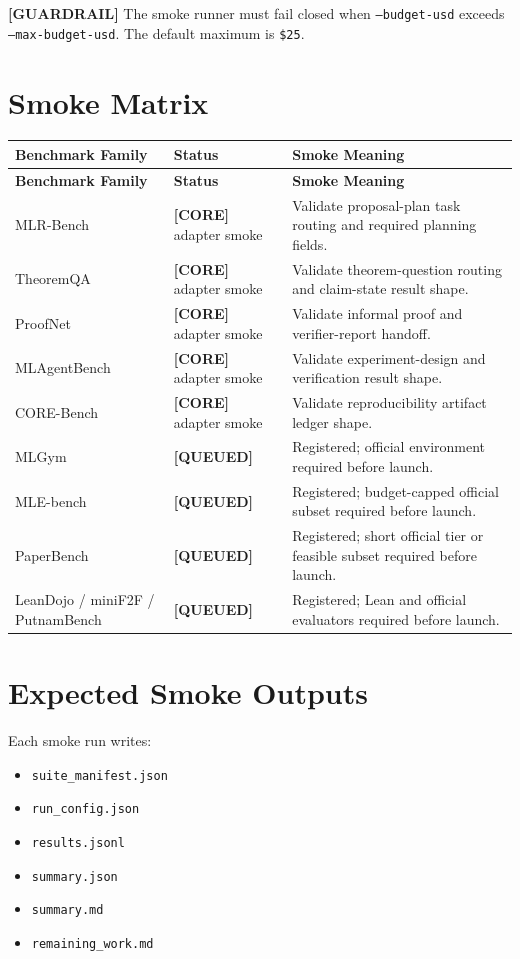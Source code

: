 \documentclass[11pt]{article}
\newcommand{\core}{\textbf{\textcolor{green!45!black}{[CORE]}}}
\newcommand{\queued}{\textbf{\textcolor{orange!80!black}{[QUEUED]}}}
\newcommand{\guard}{\textbf{\textcolor{red!65!black}{[GUARDRAIL]}}}
\begin{document}
\guard{} The smoke runner must fail closed when \texttt{--budget-usd} exceeds \texttt{--max-budget-usd}. The default maximum is \texttt{\$25}.

\section*{Smoke Matrix}

\begin{longtable}{>{\raggedright\arraybackslash}p{} >{\raggedright\arraybackslash}p{} >{\raggedright\arraybackslash}p{}}
\toprule
\textbf{Benchmark Family} & \textbf{Status} & \textbf{Smoke Meaning} \\
\midrule
\endfirsthead
\toprule
\textbf{Benchmark Family} & \textbf{Status} & \textbf{Smoke Meaning} \\
\midrule
\endhead
MLR-Bench & \core{} adapter smoke & Validate proposal-plan task routing and required planning fields. \\
TheoremQA & \core{} adapter smoke & Validate theorem-question routing and claim-state result shape. \\
ProofNet & \core{} adapter smoke & Validate informal proof and verifier-report handoff. \\
MLAgentBench & \core{} adapter smoke & Validate experiment-design and verification result shape. \\
CORE-Bench & \core{} adapter smoke & Validate reproducibility artifact ledger shape. \\
MLGym & \queued{} & Registered; official environment required before launch. \\
MLE-bench & \queued{} & Registered; budget-capped official subset required before launch. \\
PaperBench & \queued{} & Registered; short official tier or feasible subset required before launch. \\
LeanDojo / miniF2F / PutnamBench & \queued{} & Registered; Lean and official evaluators required before launch. \\
\bottomrule
\end{longtable}

\section*{Expected Smoke Outputs}

Each smoke run writes:

\begin{itemize}
  \item \texttt{suite\_manifest.json}
  \item \texttt{run\_config.json}
  \item \texttt{results.jsonl}
  \item \texttt{summary.json}
  \item \texttt{summary.md}
  \item \texttt{remaining\_work.md}
\end{itemize}
\end{document}
